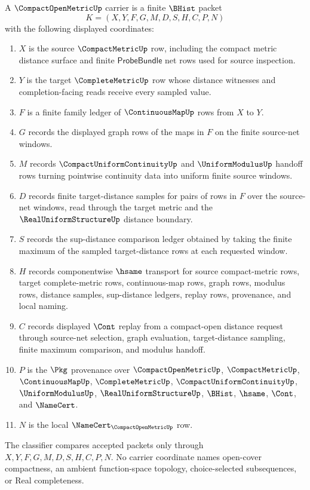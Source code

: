 \begin{definition}
\label{def:compact-open-metric-carrier}
A $\CompactOpenMetricUp$ carrier is a finite $\BHist$ packet
$$
K=(X,Y,F,G,M,D,S,H,C,P,N)
$$
with the following displayed coordinates:
\begin{enumerate}
\item $X$ is the source $\CompactMetricUp$ row, including the compact metric distance surface and finite $\mathsf{ProbeBundle}$ net rows used for source inspection.
\item $Y$ is the target $\CompleteMetricUp$ row whose distance witnesses and completion-facing reads receive every sampled value.
\item $F$ is a finite family ledger of $\ContinuousMapUp$ rows from $X$ to $Y$.
\item $G$ records the displayed graph rows of the maps in $F$ on the finite source-net windows.
\item $M$ records $\CompactUniformContinuityUp$ and $\UniformModulusUp$ handoff rows turning pointwise continuity data into uniform finite source windows.
\item $D$ records finite target-distance samples for pairs of rows in $F$ over the source-net windows, read through the target metric and the $\RealUniformStructureUp$ distance boundary.
\item $S$ records the sup-distance comparison ledger obtained by taking the finite maximum of the sampled target-distance rows at each requested window.
\item $H$ records componentwise $\hsame$ transport for source compact-metric rows, target complete-metric rows, continuous-map rows, graph rows, modulus rows, distance samples, sup-distance ledgers, replay rows, provenance, and local naming.
\item $C$ records displayed $\Cont$ replay from a compact-open distance request through source-net selection, graph evaluation, target-distance sampling, finite maximum comparison, and modulus handoff.
\item $P$ is the $\Pkg$ provenance over $\CompactOpenMetricUp$, $\CompactMetricUp$, $\ContinuousMapUp$, $\CompleteMetricUp$, $\CompactUniformContinuityUp$, $\UniformModulusUp$, $\RealUniformStructureUp$, $\BHist$, $\hsame$, $\Cont$, and $\NameCert$.
\item $N$ is the local $\NameCert_{\CompactOpenMetricUp}$ row.
\end{enumerate}
The classifier compares accepted packets only through $X,Y,F,G,M,D,S,H,C,P,N$. No carrier coordinate names open-cover compactness, an ambient function-space topology, choice-selected subsequences, or Real completeness.
\end{definition}

